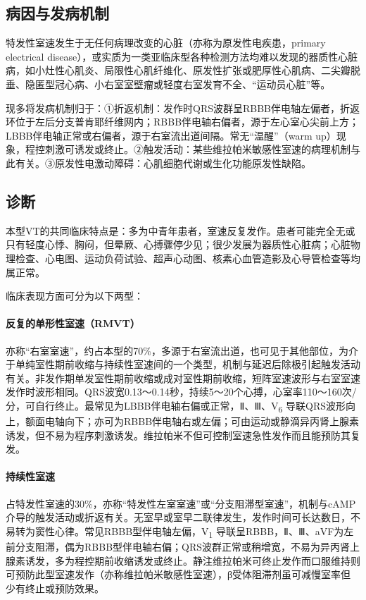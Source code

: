 \subsection{病因与发病机制}

特发性室速发生于无任何病理改变的心脏（亦称为原发性电疾患，primary
electrical
disease），或实质为一类亚临床型各种检测方法均难以发现的器质性心脏病，如小灶性心肌炎、局限性心肌纤维化、原发性扩张或肥厚性心肌病、二尖瓣脱垂、隐匿型冠心病、小右室室壁瘤或轻度右室发育不全、“运动员心脏”等。

现多将发病机制归于：①折返机制：发作时QRS波群呈RBBB伴电轴左偏者，折返环位于左后分支普肯耶纤维网内；RBBB伴电轴右偏者，源于左心室心尖前上方；LBBB伴电轴正常或右偏者，源于右室流出道间隔。常无“温醒”（warm
up）现象，程控刺激可诱发或终止。②触发活动：某些维拉帕米敏感性室速的病理机制与此有关。③原发性电激动障碍：心肌细胞代谢或生化功能原发性缺陷。

\subsection{诊断}

本型VT的共同临床特点是：多为中青年患者，室速反复发作。患者可能完全无或只有轻度心悸、胸闷，但晕厥、心搏骤停少见；很少发展为器质性心脏病；心脏物理检查、心电图、运动负荷试验、超声心动图、核素心血管造影及心导管检查等均属正常。

临床表现方面可分为以下两型：

\paragraph{反复的单形性室速（RMVT）}

亦称“右室室速”，约占本型的70\%，多源于右室流出道，也可见于其他部位，为介于单纯室性期前收缩与持续性室速间的一个类型，机制与延迟后除极引起触发活动有关。非发作期单发室性期前收缩或成对室性期前收缩，短阵室速波形与右室室速发作时波形相同。QRS波宽0.13～0.14秒，持续5～20个心搏，心室率110～160次/分，可自行终止。最常见为LBBB伴电轴右偏或正常，Ⅱ、Ⅲ、V\textsubscript{6}
导联QRS波形向上，额面电轴向下；亦可为RBBB伴电轴右或左偏；可由运动或静滴异丙肾上腺素诱发，但不易为程序刺激诱发。维拉帕米不但可控制室速急性发作而且能预防其复发。

\paragraph{持续性室速}

占特发性室速的30\%，亦称“特发性左室室速”或“分支阻滞型室速”，机制与cAMP介导的触发活动或折返有关。无室早或室早二联律发生，发作时间可长达数日，不易转为窦性心律。常见RBBB型伴电轴左偏，V\textsubscript{1}
导联呈RBBB，Ⅱ、Ⅲ、aVF为左前分支阻滞，偶为RBBB型伴电轴右偏；QRS波群正常或稍增宽，不易为异丙肾上腺素诱发，多为程控期前收缩诱发或终止。静注维拉帕米可终止发作而口服维持则可预防此型室速发作（亦称维拉帕米敏感性室速），β受体阻滞剂虽可减慢室率但少有终止或预防效果。

